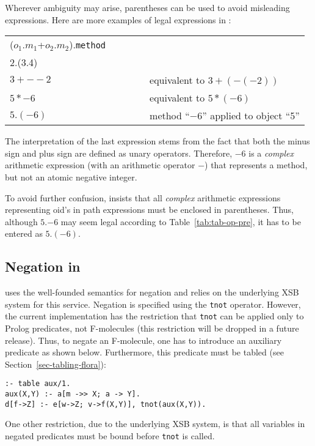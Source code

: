\documentclass[11pt]{report}
\begin{document}
Wherever ambiguity may arise, parentheses can be used to avoid misleading
expressions. Here are more examples of legal expressions in \FLORA:

\begin{table}[h]
\begin{tabular}{lll}
($o_1$.$m_1$+$o_2$.$m_2$).{\tt method} \\
2.(3.4) \\
$3+--2$ && equivalent to $3+(-(-2))$ \\
$5*-6$ && equivalent to $5*(-6)$ \\
$5.(-6)$ &~~~~~& method ``$-6$'' applied to object ``5''
\end{tabular}
\end{table}

\noindent
The interpretation of the last expression stems from the fact that both the
minus sign and plus sign are defined as unary operators. Therefore,
$-6$ is a \emph{complex} arithmetic expression (with an arithmetic operator $-$) that represents
a method, but not an atomic negative integer.

To avoid further confusion, \FLORA insists that all \emph{complex} arithmetic expressions
representing oid's in path expressions must be enclosed in parentheses. Thus, although $5.$$-6$
may seem legal according to Table~\ref{tab:tab-op-pre}, it has to be entered as $5.(-6)$.

\subsection{Negation in \FLORA}

\FLORA uses the well-founded semantics for negation and relies on the
underlying XSB system for this service. Negation is specified using the
{\tt tnot} operator. However, the current implementation has the
restriction that {\tt tnot} can be applied only to Prolog predicates, not
F-molecules (this restriction will be dropped in a future release). Thus,
to negate an F-molecule, one has to introduce an auxiliary predicate as
shown below. Furthermore, this predicate must be tabled (see
Section~\ref{sec-tabling-flora}):
\begin{verbatim}
:- table aux/1.
aux(X,Y) :- a[m ->> X; a -> Y].
d[f->Z] :- e[w->Z; v->f(X,Y)], tnot(aux(X,Y)).
\end{verbatim}
One other restriction, due to the underlying XSB system, is that all
variables in negated predicates must be bound before {\tt tnot} is called.
\end{document}
